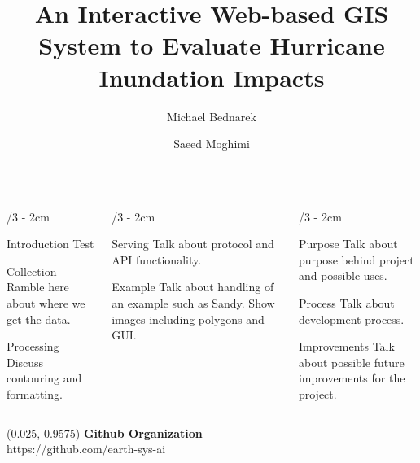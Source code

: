 \documentclass[landscape]{uioposter}
\title{An Interactive Web-based GIS System to Evaluate Hurricane Inundation Impacts}
\author
{%
    Michael Bednarek%
    \and
    Saeed Moghimi%
}
\begin{document}
\begin{frame}
\begin{columns}[onlytextwidth]


\begin{column}{\textwidth/3 - 2cm}
    \begin{block}{Introduction}
        Test
    \end{block}

    \begin{block}{Collection}
        Ramble here about where we get the data.
    \end{block}
    
    \begin{block}{Processing}
        Discuss contouring and formatting.
    \end{block}
    
\end{column}


\begin{column}{\textwidth/3 - 2cm}
    \begin{block}{Serving}
        Talk about protocol and API functionality.
    \end{block}

    \begin{exampleblock}{Example}
        Talk about handling of an example such as Sandy.
        Show images including polygons and GUI.
    \end{exampleblock}
\end{column}


\begin{column}{\textwidth/3 - 2cm}
    \begin{block}{Purpose}
        Talk about purpose behind project and possible uses.
    \end{block}
    
     \begin{block}{Process}
        Talk about development process.
    \end{block}
    

    \begin{block}{Improvements}
        Talk about possible future improvements for the project.
    \end{block}
\end{column}


\end{columns}


\begin{textblock}{0.5}(0.025, 0.9575)
    \color{white}
    \sffamily
    \textbf{Github Organization}
    \\
    https://github.com/earth-sys-ai
\end{textblock}


\end{frame}
\end{document}
